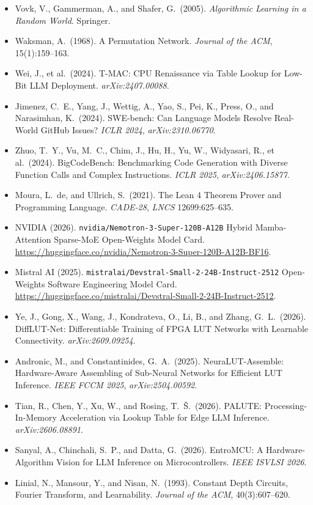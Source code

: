 \documentclass[10pt]{article}
\begin{document}
{\begin{itemize}
  \item Vovk, V., Gammerman, A., and Shafer, G.\ (2005). \emph{Algorithmic Learning in a Random World}. Springer.
  \item Waksman, A.\ (1968). A Permutation Network. \emph{Journal of the ACM}, 15(1):159--163.
  \item Wei, J., et al.\ (2024). T-MAC: CPU Renaissance via Table Lookup for Low-Bit LLM Deployment. \emph{arXiv:2407.00088}.
  \item Jimenez, C.\ E., Yang, J., Wettig, A., Yao, S., Pei, K., Press, O., and Narasimhan, K.\ (2024). SWE-bench: Can Language Models Resolve Real-World GitHub Issues? \emph{ICLR 2024}, \emph{arXiv:2310.06770}.
  \item Zhuo, T.\ Y., Vu, M.\ C., Chim, J., Hu, H., Yu, W., Widyasari, R., et al.\ (2024). BigCodeBench: Benchmarking Code Generation with Diverse Function Calls and Complex Instructions. \emph{ICLR 2025}, \emph{arXiv:2406.15877}.
  \item Moura, L.\ de, and Ullrich, S.\ (2021). The Lean 4 Theorem Prover and Programming Language. \emph{CADE-28}, \emph{LNCS} 12699:625--635.
  \item NVIDIA (2026). \texttt{nvidia/Nemotron-3-Super-120B-A12B} Hybrid Mamba-Attention Sparse-MoE Open-Weights Model Card. \url{https://huggingface.co/nvidia/Nemotron-3-Super-120B-A12B-BF16}.
  \item Mistral AI (2025). \texttt{mistralai/Devstral-Small-2-24B-Instruct-2512} Open-Weights Software Engineering Model Card. \url{https://huggingface.co/mistralai/Devstral-Small-2-24B-Instruct-2512}.
  \item Ye, J., Gong, X., Wang, J., Kondrateva, O., Li, B., and Zhang, G.\ L.\ (2026). DiffLUT-Net: Differentiable Training of FPGA LUT Networks with Learnable Connectivity. \emph{arXiv:2609.09254}.
  \item Andronic, M., and Constantinides, G.\ A.\ (2025). NeuraLUT-Assemble: Hardware-Aware Assembling of Sub-Neural Networks for Efficient LUT Inference. \emph{IEEE FCCM 2025}, \emph{arXiv:2504.00592}.
  \item Tian, R., Chen, Y., Xu, W., and Rosing, T.\ \v{S}.\ (2026). PALUTE: Processing-In-Memory Acceleration via Lookup Table for Edge LLM Inference. \emph{arXiv:2606.08891}.
  \item Sanyal, A., Chinchali, S.\ P., and Datta, G.\ (2026). EntroMCU: A Hardware-Algorithm Vision for LLM Inference on Microcontrollers. \emph{IEEE ISVLSI 2026}.
  \item Linial, N., Mansour, Y., and Nisan, N.\ (1993). Constant Depth Circuits, Fourier Transform, and Learnability. \emph{Journal of the ACM}, 40(3):607--620.

\end{itemize}}
\end{document}
